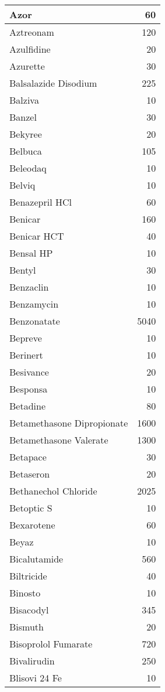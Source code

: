 \documentclass[
]{article}
\begin{document}
\begin{table}
\begin{tabular}[t]{l|r}
\hline
Azor & 60\\
\hline
Aztreonam & 120\\
\hline
Azulfidine & 20\\
\hline
Azurette & 30\\
\hline
Balsalazide Disodium & 225\\
\hline
Balziva & 10\\
\hline
Banzel & 30\\
\hline
Bekyree & 20\\
\hline
Belbuca & 105\\
\hline
Beleodaq & 10\\
\hline
Belviq & 10\\
\hline
Benazepril HCl & 60\\
\hline
Benicar & 160\\
\hline
Benicar HCT & 40\\
\hline
Bensal HP & 10\\
\hline
Bentyl & 30\\
\hline
Benzaclin & 10\\
\hline
Benzamycin & 10\\
\hline
Benzonatate & 5040\\
\hline
Bepreve & 10\\
\hline
Berinert & 10\\
\hline
Besivance & 20\\
\hline
Besponsa & 10\\
\hline
Betadine & 80\\
\hline
Betamethasone Dipropionate & 1600\\
\hline
Betamethasone Valerate & 1300\\
\hline
Betapace & 30\\
\hline
Betaseron & 20\\
\hline
Bethanechol Chloride & 2025\\
\hline
Betoptic S & 10\\
\hline
Bexarotene & 60\\
\hline
Beyaz & 10\\
\hline
Bicalutamide & 560\\
\hline
Biltricide & 40\\
\hline
Binosto & 10\\
\hline
Bisacodyl & 345\\
\hline
Bismuth & 20\\
\hline
Bisoprolol Fumarate & 720\\
\hline
Bivalirudin & 250\\
\hline
Blisovi 24 Fe & 10\\

\end{tabular}
\end{table}
\end{document}
